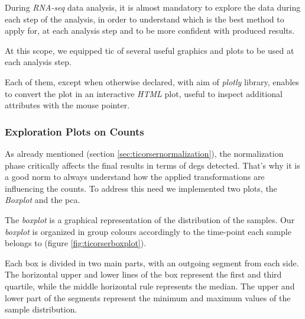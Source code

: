 During \textit{RNA-seq} data analysis, it is almost mandatory to explore the data during each step of the analysis, in order to understand which is the best method to apply for, at each analysis step and to be more confident with produced results. 

At this scope, we equipped \gls{tic} of several useful graphics and plots to be used at each analysis step.

Each of them, except when otherwise declared, with aim of \textit{plotly} library, enables to convert the plot in an interactive \textit{HTML} plot, useful to inspect additional attributes with the mouse pointer.

\subsubsection{Exploration Plots on Counts}
As already mentioned (section \ref{sec:ticorsernormalization}), the normalization phase critically affects the final results in terms of \glspl{deg} detected.
That's why it is a good norm to always understand how the applied transformations are influencing the counts. 
To address this need we implemented two plots, the \textit{Boxplot} and the \gls{pca}.

The \textit{boxplot} is a graphical representation of the distribution of the samples. 
Our \textit{boxplot} is organized in group colours accordingly to the time-point each sample belongs to (figure \ref{fig:ticorserboxplot}).

Each box is divided in two main parts, with an outgoing segment from each side. 
The horizontal upper and lower lines of the box represent the first and third quartile, while the middle horizontal rule represents the median.
The upper and lower part of the segments represent the minimum and maximum values of the sample distribution.

